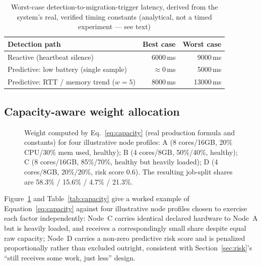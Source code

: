 \documentclass[conference]{IEEEtran}
\begin{document}
\begin{table}[t]
\caption{Worst-case detection-to-migration-trigger latency, derived from the system's real, verified
timing constants (analytical, not a timed experiment — see text)}
\label{tab:latency-bounds}
\centering
\small
\begin{tabularx}{\linewidth}{@{}X r r@{}}
\toprule
\textbf{Detection path} & \textbf{Best case} & \textbf{Worst case} \\
\midrule
Reactive (heartbeat silence) & 6000\,ms & 9000\,ms \\
Predictive: low battery (single sample) & $\approx$0\,ms & 5000\,ms \\
Predictive: RTT / memory trend ($w{=}5$) & 8000\,ms & 13000\,ms \\
\bottomrule
\end{tabularx}
\end{table}

\subsection{Capacity-aware weight allocation}

\begin{figure}[t]
\centering
{}
\caption{Weight computed by Eq.~\ref{eq:capacity} (real production formula and constants) for four
illustrative node profiles: A (8 cores/16GB, 20\% CPU/30\% mem used, healthy); B (4 cores/8GB, 50\%/40\%,
healthy); C (8 cores/16GB, 85\%/70\%, healthy but heavily loaded); D (4 cores/8GB, 20\%/20\%, risk
score 0.6). The resulting job-split shares are 58.3\% / 15.6\% / 4.7\% / 21.3\%.}
\label{fig:capacity}
\end{figure}

Figure~\ref{fig:capacity} and Table~\ref{tab:capacity} give a worked example of
Equation~\ref{eq:capacity} against four illustrative node profiles chosen to exercise each factor
independently: Node~C carries identical declared hardware to Node~A but is heavily loaded, and
receives a correspondingly small share despite equal raw capacity; Node~D carries a non-zero
predictive risk score and is penalized proportionally rather than excluded outright, consistent with
Section~\ref{sec:risk}'s ``still receives some work, just less'' design.
\end{document}
